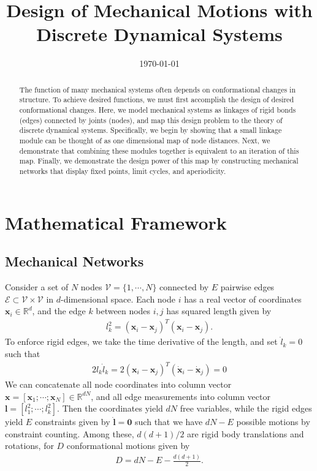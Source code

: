 \documentclass[12pt]{revtex4-1}
\newcommand{\mc}{\mathcal}
\newcommand{\real}{\mathbb{R}}
\begin{document}
\title{Design of Mechanical Motions with Discrete Dynamical Systems}
\date{\today}
\begin{abstract}
	The function of many mechanical systems often depends on conformational changes in structure. To achieve desired functions, we must first accomplish the design of desired conformational changes. Here, we model mechanical systems as linkages of rigid bonds (edges) connected by joints (nodes), and map this design problem to the theory of discrete dynamical systems. Specifically, we begin by showing that a small linkage module can be thought of as one dimensional map of node distances. Next, we demonstrate that combining these modules together is equivalent to an iteration of this map. Finally, we demonstrate the design power of this map by constructing mechanical networks that display fixed points, limit cycles, and aperiodicity.
\end{abstract}
\maketitle

\section{Mathematical Framework}
\subsection{Mechanical Networks}
Consider a set of $N$ nodes $\mc V = \{1, \dotsm, N\}$ connected by $E$ pairwise edges $\mc E \subset \mc V \times \mc V$ in $d$-dimensional space. Each node $i$ has a real vector of coordinates $\bm{x}_i \in \real^d$, and the edge $k$ between nodes $i,j$ has squared length given by
\begin{align*}
l_k^2 = (\bm{x}_i - \bm{x}_j)^T(\bm{x}_i - \bm{x}_j).
\end{align*}
To enforce rigid edges, we take the time derivative of the length, and set $\dot{l}_k = 0$ such that
\begin{align*}
2l_k\dot{l}_k = 2(\bm{x}_i-\bm{x}_j)^T(\dot{\bm{x}}_i-\dot{\bm{x}}_j) = 0
\end{align*}
We can concatenate all node coordinates into column vector $\bm{x} = [\bm{x}_1; \dotsm; \bm{x}_N] \in \real^{dN}$, and all edge measurements into column vector $\bm{l} = [l_1^2; \dotsm; l_k^2]$. Then the coordinates yield $dN$ free variables, while the rigid edges yield $E$ constraints given by $\dot{\bm{l}} = \bm{0}$ such that we have $dN - E$ possible motions by constraint counting. Among these, $d(d+1)/2$ are rigid body translations and rotations, for $D$ conformational motions given by
\begin{align*}
D = dN - E - \frac{d(d+1)}{2}.
\end{align*}
\end{document}
